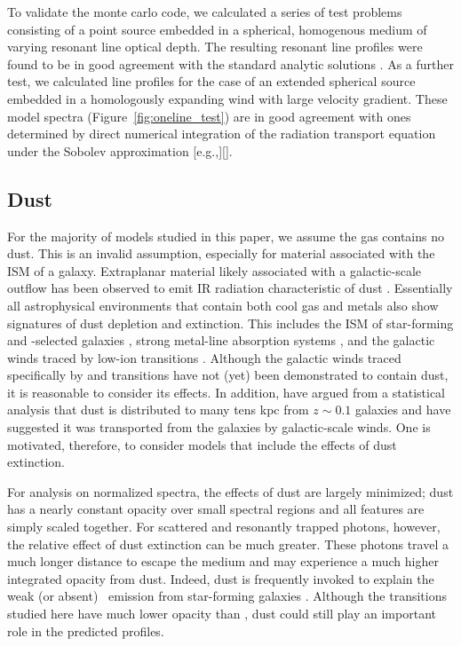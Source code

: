 \documentclass[12pt,preprint]{aastex}
\begin{document}
To validate the monte carlo code, we calculated a series of test problems consisting of a point source embedded in a spherical, homogenous medium of varying resonant line optical depth.  The resulting resonant line profiles  \citep[see][]{kasen_lyman} were
found to be in good agreement with the standard analytic solutions \citep{Harrington_1973,Neufeld_1990,Dijkstra_2006}.  As a further test, we calculated line profiles for the case of an extended spherical source embedded in a homologously expanding wind with large velocity gradient.  These model spectra (Figure~\ref{fig:oneline_test}) are in good agreement with ones determined by direct numerical integration of the radiation transport equation under the Sobolev approximation [e.g.,][]\citep{Jeffery_Branch}.


\subsection{Dust}
\label{sec:dust_method}

For the majority of models studied in this paper, we assume the gas
contains no dust.
This is an invalid assumption, especially for material associated with
the ISM of a galaxy.  
Extraplanar material likely associated with a galactic-scale 
outflow has been observed to emit IR radiation characteristic of dust 
\citep[e.g.][]{M87_dust,hrg90,adb99,rkl01}.
Essentially all astrophysical environments that contain both cool gas
and metals also show signatures of dust depletion and extinction.  This includes the
ISM of star-forming and -selected galaxies
\citep[e.g.][]{ss96,pw01,pcd+07}, strong  metal-line
absorption systems \citep{ykv+06,mnt+08}, and the galactic winds traced
by low-ion transitions \citep{prs+02,rvs05b}.  Although the galactic winds
traced specifically by  and  transitions have not (yet) been
demonstrated to contain dust, it is reasonable to consider its
effects.
In addition, \cite{msf+10} have argued from a statistical analysis
that dust is distributed to many tens kpc from $z \sim 0.1$ galaxies
and have suggested it was transported from the galaxies by
galactic-scale winds.  One is motivated, therefore, to consider
models that include the effects of dust extinction.

For analysis on normalized spectra, the effects of dust are largely minimized; 
dust has a nearly constant opacity over small spectral regions and all
features are simply scaled together.
For scattered and resonantly trapped photons, however, the relative effect of dust
extinction can be much greater.  
These photons travel a much longer distance to escape the medium and
may experience a much higher integrated opacity from dust.
Indeed, dust is frequently invoked to
explain the weak (or absent) \lya\ emission from star-forming galaxies
\citep[e.g.][]{shapley03}.  Although the transitions studied here have
much lower opacity than \lya, dust could still play an important role
in the predicted profiles.
\end{document}
